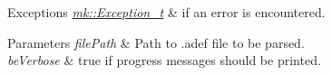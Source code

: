 \begin{DoxyExceptions}{Exceptions}
{\em \hyperlink{classmk_1_1_exception__t}{mk\+::\+Exception\+\_\+t}} & if an error is encountered. \\
\hline
\end{DoxyExceptions}

\begin{DoxyParams}{Parameters}
{\em file\+Path} & Path to .adef file to be parsed. \\
\hline
{\em be\+Verbose} & true if progress messages should be printed. \\
\hline
\end{DoxyParams}
